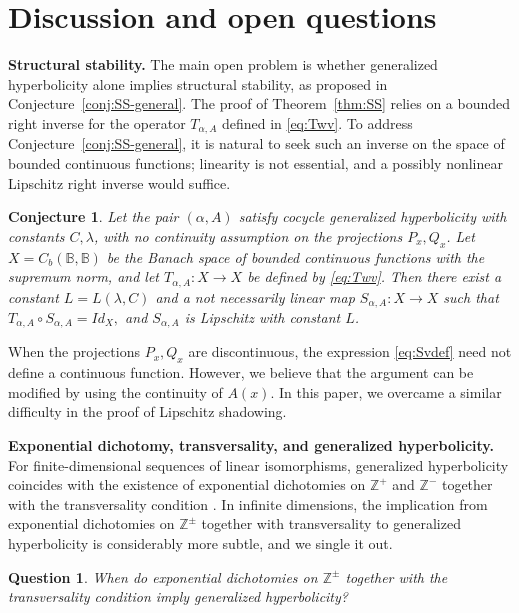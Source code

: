 \documentclass[12pt]{article}
\newcommand{\Bb}{\mathbb{B}}
\newcommand{\Zz}{\mathbb{Z}}
\newtheorem{conj}[thm]{Conjecture}
\newtheorem{quest}[thm]{Question}
\theoremstyle{definition}
\begin{document}
\section{Discussion and open questions}\label{sec:discussion}

\textbf{Structural stability.} The main open problem is whether
generalized hyperbolicity alone implies structural stability, as proposed in Conjecture~\ref{conj:SS-general}. 
The proof of Theorem~\ref{thm:SS} relies on a bounded right inverse for the operator $T_{\alpha,A}$ defined in \eqref{eq:Twv}. To address Conjecture~\ref{conj:SS-general}, it is natural to seek such an inverse on the space of bounded continuous functions; linearity is not essential, and a possibly nonlinear Lipschitz right inverse would suffice.
\begin{conj}\label{conj:inv-cocycle}
Let the pair $(\alpha,A)$ satisfy cocycle generalized hyperbolicity
with constants $C,\lambda$, with no continuity assumption on the
projections $P_x,Q_x$. Let
$
X=C_b(\Bb,\Bb)
$
be the Banach space of bounded continuous functions with the supremum
norm, and let $T_{\alpha,A}:X\to X$ be defined by \eqref{eq:Twv}.
Then there exist a constant $L=L(\lambda,C)$ and a not necessarily
linear map $S_{\alpha,A}:X\to X$ such that
$
T_{\alpha,A}\circ S_{\alpha,A}=Id_X,
$
and $S_{\alpha,A}$ is Lipschitz with constant $L$.
\end{conj}
When the projections $P_x,Q_x$ are discontinuous, the expression \eqref{eq:Svdef} need not define a continuous function. However, we believe that the argument can be modified by using the continuity of $A(x)$. In this paper, we overcame a similar difficulty in the proof of Lipschitz shadowing.

\smallskip

\textbf{Exponential dichotomy, transversality, and generalized hyperbolicity.} For finite-dimensional sequences of linear isomorphisms,
generalized hyperbolicity coincides with the existence of exponential
dichotomies on $\Zz^+$ and $\Zz^-$ together with the transversality
condition \cite{PilCL,Pli77}. In infinite dimensions, the implication from exponential dichotomies on $\Zz^\pm$ together with transversality to generalized hyperbolicity is considerably more subtle, and we single it out.

\begin{quest}\label{quest:ED}
    When do exponential dichotomies on $\Zz^{\pm}$ together with the transversality condition imply generalized hyperbolicity?
\end{quest}
\end{document}
